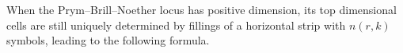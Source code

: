 \documentclass[11pt,reqno]{amsart}
\theoremstyle{definition}
\theoremstyle{problem}
\theoremstyle{plain}
\newtheorem{proposition}[definition]{Proposition}
\theoremstyle{remark}
\theoremstyle{theorem}
\numberwithin{equation}{section}
\numberwithin{figure}{section}
\theoremstyle{definition}
\theoremstyle{problem}
\theoremstyle{plain}
\begin{document}
%
%
%
%  
%
%  
%  


When the Prym--Brill--Noether locus has positive dimension, its top dimensional cells are still uniquely determined by fillings of a horizontal strip with $n(r,k)$ symbols, leading to the following formula.  


\end{document}
